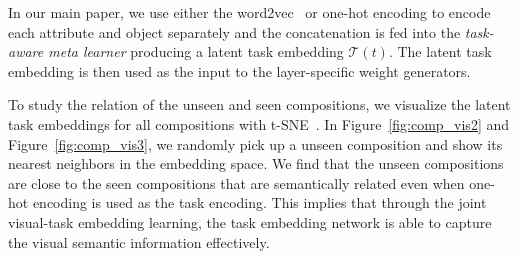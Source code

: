 \documentclass[10pt,twocolumn,letterpaper]{article}
\begin{document}
In our main paper, we use either the word2vec~\cite{mikolov2013efficient} or one-hot encoding to encode
each attribute and object separately and the concatenation is fed into the 
\textit{task-aware meta learner} producing a latent task embedding $\mathcal{T}(t)$. 
The latent task embedding is then used as the input to 
the layer-specific weight generators. 

To study the relation of the unseen and seen compositions, we visualize the latent task embeddings for all compositions with t-SNE~\cite{tsne}. In Figure~\ref{fig:comp_vis2} and Figure~\ref{fig:comp_vis3}, we randomly pick up a 
unseen composition and show its nearest neighbors in the embedding space.  
We find that the unseen compositions are close to the seen compositions that are
semantically related even when one-hot encoding is used as the task encoding.
This implies that through the joint visual-task embedding learning, the task
embedding network is able to capture the visual semantic information effectively.

\clearpage
\clearpage{\small


}
\end{document}
